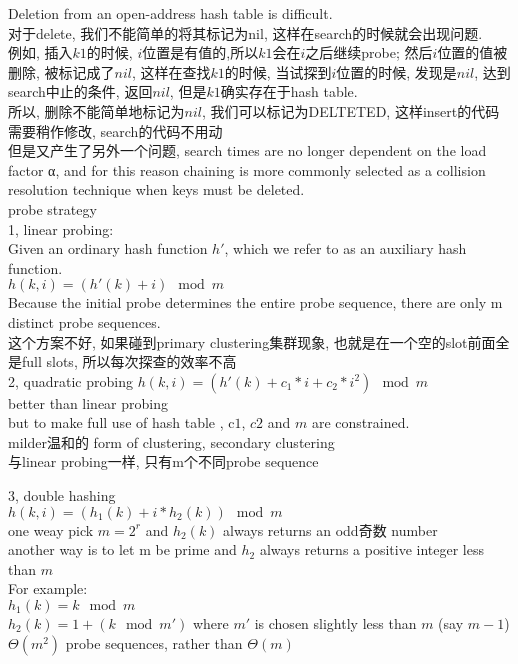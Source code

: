 \documentclass{article}
\begin{document}
Deletion from an open-address hash table is difficult.\\
对于delete, 我们不能简单的将其标记为nil, 这样在search的时候就会出现问题.\\
例如, 插入$k1$的时候, $i$位置是有值的,所以$k1$会在$i$之后继续probe; 然后$i$位置的值被删除, 被标记成了$nil$, 这样在查找$k1$的时候, 当试探到$i$位置的时候, 发现是$nil$, 达到search中止的条件, 返回$nil$, 但是$k1$确实存在于hash table.\\
所以, 删除不能简单地标记为$nil$, 我们可以标记为DELTETED, 这样insert的代码需要稍作修改, search的代码不用动\\
但是又产生了另外一个问题, search times are no longer dependent on the load factor α, and for this reason chaining is more commonly selected as a collision resolution technique when keys must be deleted.\\
probe strategy\\
1, linear probing: \\
Given an ordinary hash function $h'$, which we refer to as an auxiliary hash function.\\
$h(k,i)=(h'(k)+i) \mod m$\\
Because the initial probe determines the entire probe sequence, there are only m distinct probe sequences.\\
这个方案不好, 如果碰到primary clustering集群现象, 也就是在一个空的slot前面全是full slots, 所以每次探查的效率不高\\

2, quadratic probing $h(k,i)=(h'(k) + c_1 * i + c_2 * i^2) \mod m$\\
better than linear probing\\
but to make full use of hash table , c$1$, $c2$ and $m$ are constrained.\\
milder温和的 form of clustering, secondary clustering\\
与linear probing一样, 只有m个不同probe sequence

3, double hashing\\
$h(k,i)=(h_1(k) + i*h_2(k))\mod m$\\
one weay pick $m=2^r$ and $h_2(k)$ always returns an odd奇数 number\\
another way is to let m be prime and $h_2$ always returns a positive integer less than $m$\\
For example:\\
$h_1(k) = k\mod m$\\
$h_2(k) = 1+ (k\mod m')$ where $m'$ is chosen slightly less than $m$ (say $m-1$)\\
$\Theta(m^2)$ probe sequences, rather than $\Theta(m)$\\
\end{document}
